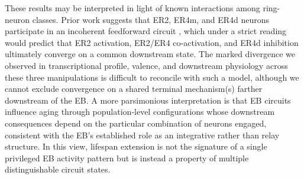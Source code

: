 These results may be interpreted in light of known interactions among ring-neuron classes. 
Prior work suggests that ER2, ER4m, and ER4d neurons participate in an incoherent feedforward circuit \citep{ishimoto2020}, which under a strict reading would predict that ER2 activation, ER2/ER4 co-activation, and ER4d inhibition ultimately converge on a common downstream state. 
The marked divergence we observed in transcriptional profile, valence, and downstream physiology across these three manipulations is difficult to reconcile with such a model, although we cannot exclude convergence on a shared terminal mechanism(s) farther downstream of the EB. 
A more parsimonious interpretation is that EB circuits influence aging through population-level configurations whose downstream consequences depend on the particular combination of neurons engaged, consistent with the EB's established role as an integrative rather than relay structure. 
In this view, lifespan extension is not the signature of a single privileged EB activity pattern but is instead a property of multiple distinguishable circuit states.


